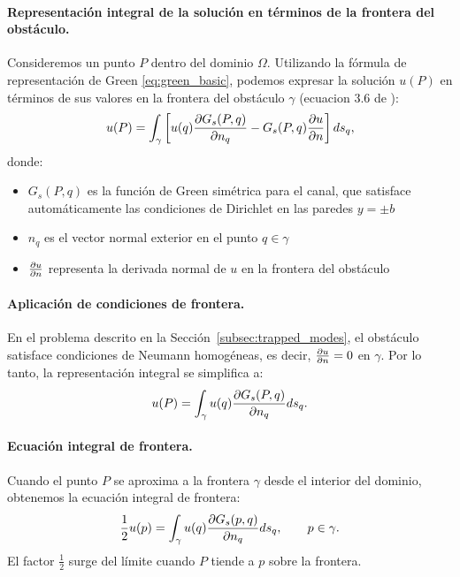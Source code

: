 \documentclass[11pt]{article}
\begin{document}
\paragraph{Representación integral de la solución en términos de la frontera del obstáculo.} Consideremos un punto $P$ dentro del dominio $\Omega$. Utilizando la fórmula de representación de Green \ref{eq:green_basic}, podemos expresar la solución $u(P)$ en términos de sus valores en la frontera del obstáculo $\gamma$ (ecuacion 3.6 de \cite{Linton1992}):
\begin{equation}
u(P) = \int_{\gamma} \left[ u(q) \pdv{G_s(P,q)}{n_q} - G_s(P,q) \pdv{u}{n}(q) \right] ds_q,
\end{equation}
donde:
\begin{itemize}
    \item $G_s(P,q)$ es la función de Green simétrica para el canal, que satisface automáticamente las condiciones de Dirichlet en las paredes $y = \pm b$
    \item $n_q$ es el vector normal exterior en el punto $q \in \gamma$
    \item $\pdv{u}{n}(q)$ representa la derivada normal de $u$ en la frontera del obstáculo
\end{itemize}

\paragraph{Aplicación de condiciones de frontera.} En el problema descrito en la Sección~\ref{subsec:trapped_modes}, el obstáculo satisface condiciones de Neumann homogéneas, es decir, $\pdv{u}{n} = 0$ en $\gamma$. Por lo tanto, la representación integral se simplifica a:
\begin{equation}
u(P) = \int_{\gamma} u(q) \pdv{G_s(P,q)}{n_q} ds_q.
\end{equation}

\paragraph{Ecuación integral de frontera.} Cuando el punto $P$ se aproxima a la frontera $\gamma$ desde el interior del dominio, obtenemos la ecuación integral de frontera:
\begin{equation}
\frac{1}{2} u(p) = \int_{\gamma} u(q) \pdv{G_s(p,q)}{n_q} ds_q, \qquad p \in \gamma.
\end{equation}
El factor $\frac{1}{2}$ surge del límite cuando $P$ tiende a $p$ sobre la frontera.
\end{document}
